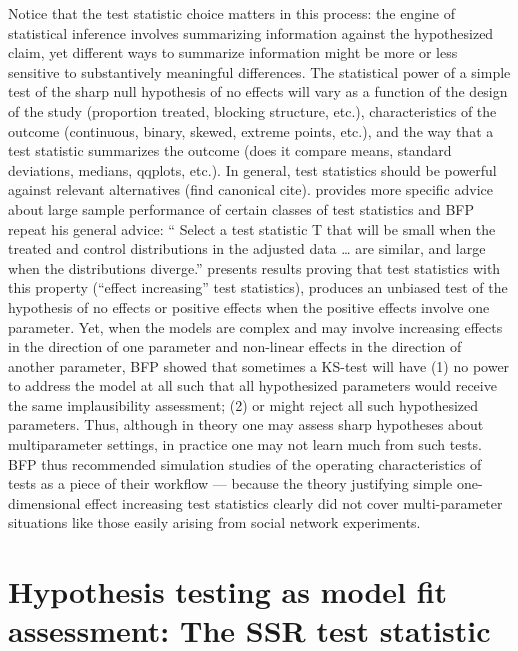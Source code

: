 Notice that the test statistic choice matters in this process: the engine of
statistical inference involves summarizing information against the
hypothesized claim, yet different ways to summarize information might be more
or less sensitive to substantively meaningful differences. The statistical
power of a simple test of the sharp null hypothesis of no effects will vary as
a function of the design of the study (proportion treated, blocking structure,
etc.), characteristics of the outcome (continuous, binary, skewed, extreme
points, etc.), and the way that a test statistic summarizes the outcome (does
it compare means, standard deviations, medians, qqplots, etc.). In general,
test statistics should be powerful against relevant alternatives (find
canonical cite). \citet[\S 2.4.4]{rosenbaum:2002} provides more specific
advice about large sample performance of certain classes of test statistics
and BFP repeat his general advice: `` Select a test statistic T that will be
small when the treated and control distributions in the adjusted data \ldots
are similar, and large when the distributions diverge.'' \citet[Proposition 4
and 5, \S 2.9]{rosenbaum:2002} presents results proving that test statistics
with this property (``effect increasing'' test statistics), produces an
unbiased test of the hypothesis of no effects or positive effects when the
positive effects involve one parameter.  Yet, when the models are complex and
may involve increasing effects in the direction of one parameter and
non-linear effects in the direction of another parameter, BFP showed that
sometimes a KS-test will have (1) no power to address the model at all such
that all hypothesized parameters would receive the same implausibility
assessment; (2) or might reject all such hypothesized parameters. Thus,
although in theory one may assess sharp hypotheses about multiparameter
settings, in practice one may not learn much from such tests. BFP thus recommended simulation studies of the operating
characteristics of tests as a piece of their workflow --- because  the theory
justifying simple one-dimensional effect increasing test statistics clearly
did not cover multi-parameter situations like those easily arising from social
network experiments.

\section{Hypothesis testing as model fit assessment: The SSR test statistic}

